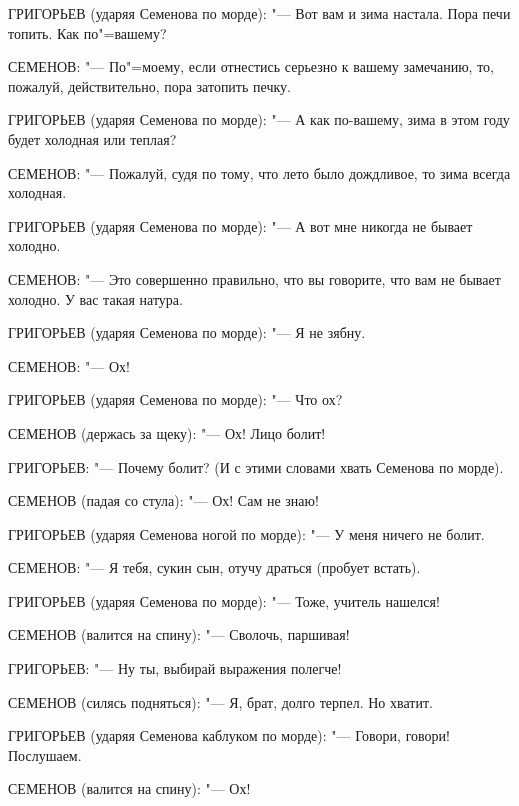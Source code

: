 ГРИГОРЬЕВ (ударяя Семенова по морде): "--- Вот вам и зима настала. Пора печи топить. Как по"=вашему?

СЕМЕНОВ: "--- По"=моему, если отнестись серьезно к вашему замечанию, то, пожалуй, действительно, пора затопить печку.

ГРИГОРЬЕВ (ударяя Семенова по морде): "--- А как по-вашему, зима в этом году будет холодная или теплая?

СЕМЕНОВ: "--- Пожалуй, судя по тому, что лето было дождливое, то зима всегда холодная.

ГРИГОРЬЕВ (ударяя Семенова по морде): "--- А вот мне никогда не бывает холодно.

СЕМЕНОВ: "--- Это совершенно правильно, что вы говорите, что вам не бывает холодно. У вас такая натура.

ГРИГОРЬЕВ (ударяя Семенова по морде): "--- Я не зябну.

СЕМЕНОВ: "--- Ох!

ГРИГОРЬЕВ (ударяя Семенова по морде): "--- Что ох?

СЕМЕНОВ (держась за щеку): "--- Ох! Лицо болит!

ГРИГОРЬЕВ: "--- Почему болит? (И с этими словами хвать Семенова по морде).

СЕМЕНОВ (падая со стула): "--- Ох! Сам не знаю!

ГРИГОРЬЕВ (ударяя Семенова ногой по морде): "--- У меня ничего не болит.

СЕМЕНОВ: "--- Я тебя, сукин сын, отучу драться (пробует встать).

ГРИГОРЬЕВ (ударяя Семенова по морде): "--- Тоже, учитель нашелся!

СЕМЕНОВ (валится на спину): "--- Сволочь, паршивая!

ГРИГОРЬЕВ: "--- Ну ты, выбирай выражения полегче!

СЕМЕНОВ (силясь подняться): "--- Я, брат, долго терпел. Но хватит.

ГРИГОРЬЕВ (ударяя Семенова каблуком по морде): "--- Говори, говори! Послушаем.

СЕМЕНОВ (валится на спину): "--- Ох!